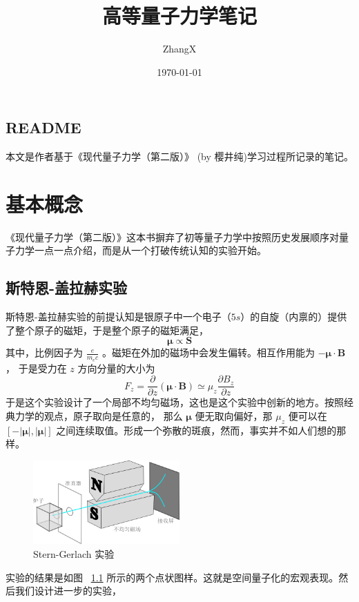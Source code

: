 \documentclass{book}
\title{高等量子力学笔记}
\author{ZhangX}
\date{\today} %
\newenvironment{abstract}{\section*{README}}{\par}
\begin{document}
\maketitle

\begin{abstract}
本文是作者基于《现代量子力学（第二版）》 (by 樱井纯)学习过程所记录的笔记。
\end{abstract}


\chapter{基本概念} %
《现代量子力学（第二版）》这本书摒弃了初等量子力学中按照历史发展顺序对量子力学一点一点介绍，而是从一个打破传统认知的实验开始。
\section{斯特恩-盖拉赫实验}
斯特恩-盖拉赫实验的前提认知是银原子中一个电子（$5s$）的自旋（内禀的）提供了整个原子的磁矩，于是整个原子的磁矩满足，
\begin{equation}
    \bm{\mu} \propto \mathbf{S}
    \label{eq:1.1}
\end{equation}
其中，比例因子为 $\displaystyle \frac{e}{m_ec}$ 。磁矩在外加的磁场中会发生偏转。相互作用能为 $-\bm{\mu} \cdot \mathbf{B}$ ，
于是受力在 $z$ 方向分量的大小为
\begin{equation}
    F_z = \frac{\partial}{\partial z}\left(\bm{\mu}\cdot\mathbf{B}\right) 
    \simeq \mu_z \frac{\partial B_z}{\partial z}
    \label{eq:1.2}
\end{equation}
于是这个实验设计了一个局部不均匀磁场，这也是这个实验中创新的地方。按照经典力学的观点，原子取向是任意的，
那么 $\bm{\mu}$ 便无取向偏好，那 $\mu_z$ 便可以在 $[-|\bm{\mu}|, |\bm{\mu}|]$ 之间连续取值。形成一个弥散的斑痕，然而，事实并不如人们想的那样。
\begin{figure}[h]
    \centering
    \includegraphics[width=0.5\textwidth]{img/斯特恩}
    \caption{Stern-Gerlach 实验}
    \label{fig:1.1}
\end{figure} 
实验的结果是如图 ~\ref{fig:1.1} 所示的两个点状图样。这就是空间量子化的宏观表现。然后我们设计进一步的实验，
\end{document}
